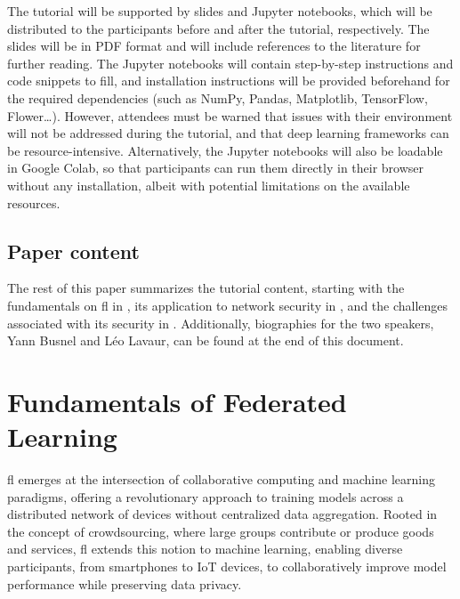 \documentclass[conference]{IEEEtran}
\begin{document}
The tutorial will be supported by slides and Jupyter notebooks, which will be distributed to the participants before and after the tutorial, respectively.
The slides will be in PDF format and will include references to the literature for further reading.
The Jupyter notebooks will contain step-by-step instructions and code snippets to fill, and installation instructions will be provided beforehand for the required dependencies (such as NumPy, Pandas, Matplotlib, TensorFlow, Flower\dots).
However, attendees must be warned that issues with their environment will not be addressed during the tutorial, and that deep learning frameworks can be resource-intensive.
Alternatively, the Jupyter notebooks will also be loadable in Google Colab, so that participants can run them directly in their browser without any installation, albeit with potential limitations on the available resources.

\subsection{Paper content}

The rest of this paper summarizes the tutorial content, starting with the fundamentals on \gls{fl} in , its application to network security in , and the challenges associated with its security in .
Additionally, biographies for the two speakers, Yann Busnel and Léo Lavaur, can be found at the end of this document.


\section{Fundamentals of Federated Learning\label{sec:fl}} %

\Gls{fl} emerges at the intersection of collaborative computing and machine learning paradigms, offering a revolutionary approach to training models across a distributed network of devices without centralized data aggregation.
Rooted in the concept of crowdsourcing, where large groups contribute or produce goods and services, \gls{fl} extends this notion to machine learning, enabling diverse participants, from smartphones to IoT devices, to collaboratively improve model performance while preserving data privacy.

\end{document}
